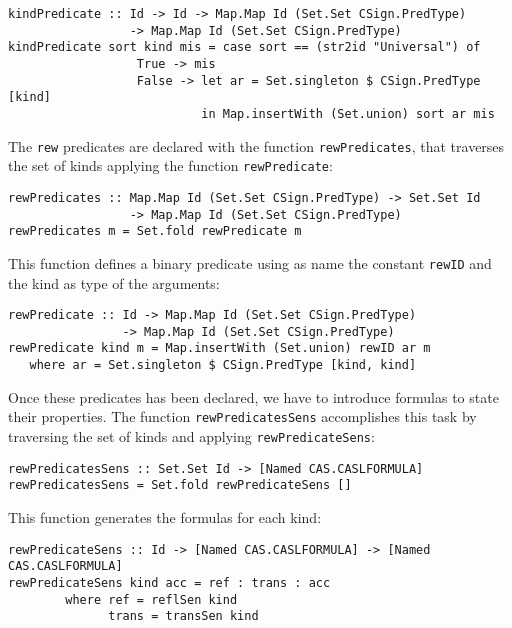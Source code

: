 {\codesize
\begin{verbatim}
kindPredicate :: Id -> Id -> Map.Map Id (Set.Set CSign.PredType)
                 -> Map.Map Id (Set.Set CSign.PredType)
kindPredicate sort kind mis = case sort == (str2id "Universal") of
                  True -> mis
                  False -> let ar = Set.singleton $ CSign.PredType [kind]
                           in Map.insertWith (Set.union) sort ar mis
\end{verbatim}
}

The \verb"rew" predicates are declared with the function
\verb"rewPredicates", that traverses the set of kinds applying
the function \verb"rewPredicate":

{\codesize
\begin{verbatim}
rewPredicates :: Map.Map Id (Set.Set CSign.PredType) -> Set.Set Id
                 -> Map.Map Id (Set.Set CSign.PredType)
rewPredicates m = Set.fold rewPredicate m
\end{verbatim}
}

This function defines a binary predicate using as name the constant
\verb"rewID" and the kind as type of the arguments:

{\codesize
\begin{verbatim}
rewPredicate :: Id -> Map.Map Id (Set.Set CSign.PredType)
                -> Map.Map Id (Set.Set CSign.PredType)
rewPredicate kind m = Map.insertWith (Set.union) rewID ar m
   where ar = Set.singleton $ CSign.PredType [kind, kind]
\end{verbatim}
}

Once these predicates has been declared, we have to introduce
formulas to state their properties. The function \verb"rewPredicatesSens"
accomplishes this task by traversing the set of kinds and applying
\verb"rewPredicateSens":

{\codesize
\begin{verbatim}
rewPredicatesSens :: Set.Set Id -> [Named CAS.CASLFORMULA]
rewPredicatesSens = Set.fold rewPredicateSens []
\end{verbatim}
}

This function generates the formulas for each kind:

{\codesize
\begin{verbatim}
rewPredicateSens :: Id -> [Named CAS.CASLFORMULA] -> [Named CAS.CASLFORMULA]
rewPredicateSens kind acc = ref : trans : acc
        where ref = reflSen kind
              trans = transSen kind
\end{verbatim}
}

